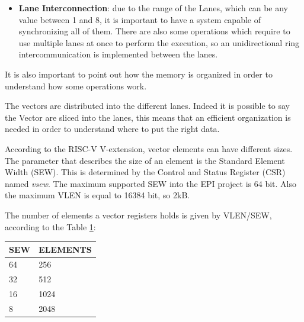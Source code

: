\begin{itemize}
    This solution implies the existence of some cost in terms of latency, due to the starting of a new instruction.
    Inside the Vector Lane the Write-Back Buffer (WB) and the Load Buffer (LB) are important as well. Those buffers store the data until the VRF line is complete.
    There is also the Store Buffer (SB) which holds the data read from the register file and then sends it to the Store Unit. 
    Eventually when an instruction is completed the physical register are freed. 
    
    The VPU can be configured with different numbers of lanes from 1 up to 8, the default value is 8.
    
    \item \textbf{Lane Interconnection}: due to the range of the Lanes, which can be any value between 1 and 8, it is important to have a system capable of synchronizing all of them. There are also some operations which require to use multiple lanes at once to perform the execution, so an unidirectional ring intercommunication is implemented between the lanes.
\end{itemize}

It is also important to point out how the memory is organized in order to understand how some operations work.

The vectors are distributed into the different lanes. Indeed it is possible to say the Vector are sliced into the lanes, this means that an efficient organization is needed in order to understand where to put the right data.


According to the RISC-V V-extension, vector elements can have different sizes. The parameter that describes the size of an element is the Standard Element Width (SEW). This is determined by the Control and Status Register (CSR) named \emph{vsew}. The maximum supported SEW into the EPI project is 64 bit. Also the maximum VLEN is equal to 16384 bit, so 2kB.

The number of elements a vector registers holds is given by VLEN/SEW, according to the Table \ref{sew-el}:


\begin{table}[H]
    \centering
    \begin{tabular}{|l|l|}
    \hline
        \rowcolor[HTML]{C0C0C0} 
        SEW & ELEMENTS \\ \hline
        64  & 256      \\ \hline
        32  & 512      \\ \hline
        16  & 1024     \\ \hline
        8   & 2048     \\ \hline
    \end{tabular}
    \label{sew-el}
\end{table}

